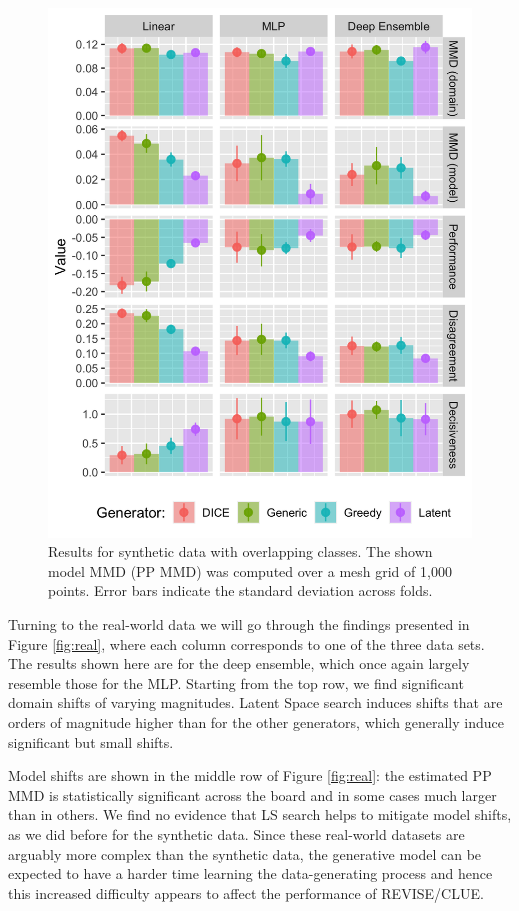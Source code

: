 \documentclass[conference,final,]{IEEEtran}
\theoremstyle{definition}
\theoremstyle{definition}
\theoremstyle{definition}
\theoremstyle{definition}
\theoremstyle{remark}
\begin{document}
\begin{figure}

{\centering \includegraphics[width=0.9\linewidth]{www/synthetic_results} 

}

\caption{Results for synthetic data with overlapping classes. The shown model MMD (PP MMD) was computed over a mesh grid of 1,000 points. Error bars indicate the standard deviation across folds.}\label{fig:syn}
\end{figure}

Turning to the real-world data we will go through the findings presented in Figure \ref{fig:real}, where each column corresponds to one of the three data sets. The results shown here are for the deep ensemble, which once again largely resemble those for the MLP. Starting from the top row, we find significant domain shifts of varying magnitudes. Latent Space search induces shifts that are orders of magnitude higher than for the other generators, which generally induce significant but small shifts.

Model shifts are shown in the middle row of Figure \ref{fig:real}: the estimated PP MMD is statistically significant across the board and in some cases much larger than in others. We find no evidence that LS search helps to mitigate model shifts, as we did before for the synthetic data. Since these real-world datasets are arguably more complex than the synthetic data, the generative model can be expected to have a harder time learning the data-generating process and hence this increased difficulty appears to affect the performance of REVISE/CLUE.
\end{document}
